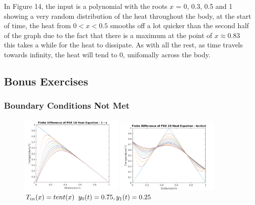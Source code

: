 \documentclass[11pt,a4paper]{article}
\begin{document}
\vspace{4mm}In Figure 14, the input is a polynomial with the roots $x$ = 0, 0.3, 0.5 and 1 showing a very random distribution of the heat throughout the body, at the start of time, the heat from $0 < x < 0.5$ smooths off a lot quicker than  the second half of the graph due to the fact that there is a maximum at the point of $x \approx 0.83$ this takes a while for the heat to dissipate. As with all the rest, as time travels towards infinity, the heat will tend to 0, unifomally across the body.

\vspace{40mm}
\subsection{Bonus Exercises}
\subsubsection{Boundary Conditions Not Met}

\begin{figure}
	\vspace{-10mm}
	\includegraphics[width=0.45\textwidth]{Ex4_Figs/1-xbcdiff.png}
	\vspace{-3mm}
	\caption{$T_{in}(x)= 1-x$}
	\label{fig:bcnm}
		\includegraphics[width=0.45\textwidth]{Ex4_Figs/Tentbc.png}
		\vspace{-3mm}
	\caption{$T_{in}(x)= tent(x) \hspace{2mm} y_0(t) = 0.75, y_1(t) = 0.25$}
	\label{fig:bmsn2}
\end{figure}
\end{document}
